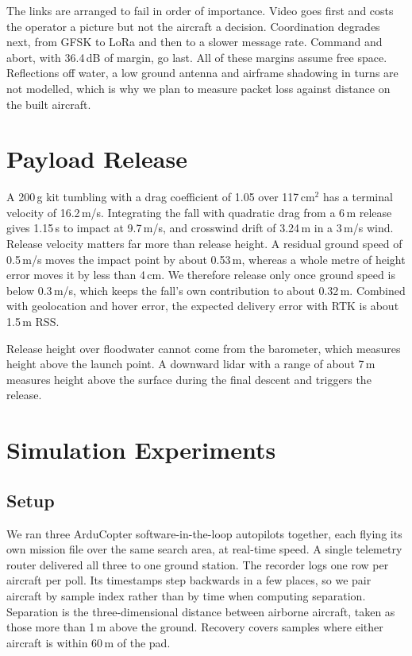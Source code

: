 \documentclass[conference]{IEEEtran}
\begin{document}
The links are arranged to fail in order of importance. Video goes first and
costs the operator a picture but not the aircraft a decision. Coordination
degrades next, from GFSK to LoRa and then to a slower message rate. Command and
abort, with 36.4\,dB of margin, go last. All of these margins assume free space.
Reflections off water, a low ground antenna and airframe shadowing in turns are
not modelled, which is why we plan to measure packet loss against distance on
the built aircraft.

\section{Payload Release}
\label{sec:delivery}

A 200\,g kit tumbling with a drag coefficient of 1.05 over 117\,cm$^2$ has a
terminal velocity of 16.2\,m/s. Integrating the fall with quadratic drag from a
6\,m release gives 1.15\,s to impact at 9.7\,m/s, and crosswind drift of
3.24\,m in a 3\,m/s wind. Release velocity matters far more than release height.
A residual ground speed of 0.5\,m/s moves the impact point by about 0.53\,m,
whereas a whole metre of height error moves it by less than 4\,cm. We therefore
release only once ground speed is below 0.3\,m/s, which keeps the fall's own
contribution to about 0.32\,m. Combined with geolocation and hover error, the
expected delivery error with RTK is about 1.5\,m RSS.

Release height over floodwater cannot come from the barometer, which measures
height above the launch point. A downward lidar with a range of about 7\,m
measures height above the surface during the final descent and triggers the
release.

\section{Simulation Experiments}
\label{sec:sim}

\subsection{Setup}

We ran three ArduCopter software-in-the-loop autopilots together, each flying
its own mission file over the same search area, at real-time speed. A single
telemetry router delivered all three to one ground station. The recorder logs
one row per aircraft per poll. Its timestamps step backwards in a few places, so
we pair aircraft by sample index rather than by time when computing separation.
Separation is the three-dimensional distance between airborne aircraft, taken as
those more than 1\,m above the ground. Recovery covers samples where either
aircraft is within 60\,m of the pad.
\end{document}
